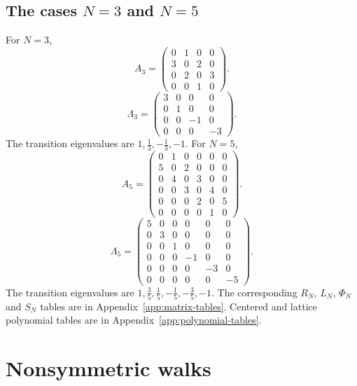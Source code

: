 \subsection{The cases $N=3$ and $N=5$}
For $N=3$,
\begingroup
\small
\setlength{\arraycolsep}{3pt}
\[
A_{3}=\begin{pmatrix}
0 & 1 & 0 & 0 \\
3 & 0 & 2 & 0 \\
0 & 2 & 0 & 3 \\
0 & 0 & 1 & 0
\end{pmatrix}.
\]
\endgroup
\begingroup
\small
\setlength{\arraycolsep}{3pt}
\[
\Lambda_{3}=\begin{pmatrix}
3 & 0 & 0 & 0 \\
0 & 1 & 0 & 0 \\
0 & 0 & -1 & 0 \\
0 & 0 & 0 & -3
\end{pmatrix}.
\]
\endgroup
The transition eigenvalues are $1,\frac{1}{3},- \frac{1}{3},-1$.
For $N=5$,
\begingroup
\small
\setlength{\arraycolsep}{3pt}
\[
A_{5}=\begin{pmatrix}
0 & 1 & 0 & 0 & 0 & 0 \\
5 & 0 & 2 & 0 & 0 & 0 \\
0 & 4 & 0 & 3 & 0 & 0 \\
0 & 0 & 3 & 0 & 4 & 0 \\
0 & 0 & 0 & 2 & 0 & 5 \\
0 & 0 & 0 & 0 & 1 & 0
\end{pmatrix}.
\]
\endgroup
\begingroup
\small
\setlength{\arraycolsep}{3pt}
\[
\Lambda_{5}=\begin{pmatrix}
5 & 0 & 0 & 0 & 0 & 0 \\
0 & 3 & 0 & 0 & 0 & 0 \\
0 & 0 & 1 & 0 & 0 & 0 \\
0 & 0 & 0 & -1 & 0 & 0 \\
0 & 0 & 0 & 0 & -3 & 0 \\
0 & 0 & 0 & 0 & 0 & -5
\end{pmatrix}.
\]
\endgroup
The transition eigenvalues are $1,\frac{3}{5},\frac{1}{5},- \frac{1}{5},- \frac{3}{5},-1$.
The corresponding $R_N$, $L_N$, $\Phi_N$ and $S_N$ tables are in
Appendix~\ref{app:matrix-tables}. Centered and lattice polynomial tables
are in Appendix~\ref{app:polynomial-tables}.

\section{Nonsymmetric walks}
\label{sec:2-3}

